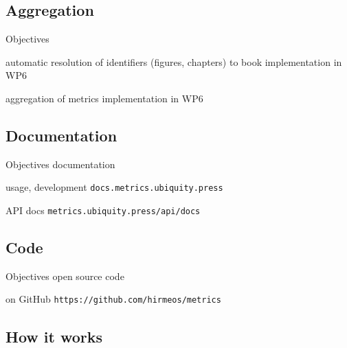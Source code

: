 \documentclass[xcolor=svgnames]{beamer}
\begin{document}
    \subsection{Aggregation}

        \begin{frame}{Objectives}
            \begin{block}{automatic resolution of identifiers (figures, chapters) to book}
                implementation in WP6
            \end{block}
            \begin{block}{aggregation of metrics}
                implementation in WP6
            \end{block}
        \end{frame}

    \subsection{Documentation}

        \begin{frame}{Objectives}
            documentation
            \begin{block}{usage, development}
                \texttt{docs.metrics.ubiquity.press}
            \end{block}
            \begin{block}{API docs}
                \texttt{metrics.ubiquity.press/api/docs}
            \end{block}
        \end{frame}

    \subsection{Code}

        \begin{frame}{Objectives}
            open source code
            \begin{block}{on GitHub}
                \texttt{https://github.com/hirmeos/metrics}
            \end{block}
        \end{frame}

    \subsection{How it works}
\end{document}
